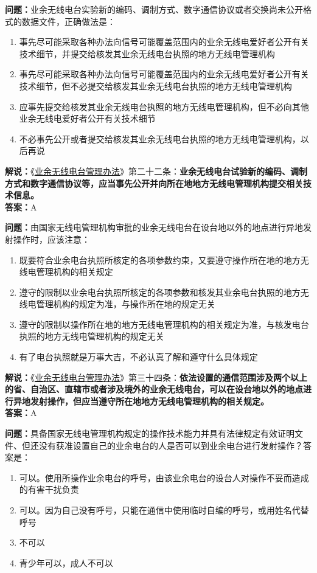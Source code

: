 \textbf{问题：}业余无线电台实验新的编码、调制方式、数字通信协议或者交换尚未公开格式的数据文件，正确做法是：
\begin{enumerate}[label=\Alph*), leftmargin=1.5cm]
	\item 事先尽可能采取各种办法向信号可能覆盖范围内的业余无线电爱好者公开有关技术细节，并提交给核发其业余无线电台执照的地方无线电管理机构
	\item 事先尽可能采取各种办法向信号可能覆盖范围内的业余无线电爱好者公开有关技术细节，但不必提交给核发其业余无线电台执照的地方无线电管理机构
	\item 应事先提交给核发其业余无线电台执照的地方无线电管理机构，但不必向其他业余无线电爱好者公开有关技术细节
	\item 不必事先公开或者提交给核发其业余无线电台执照的地方无线电管理机构，以后再说
\end{enumerate}
\textbf{解说：}《\href{https://www.miit.gov.cn/jgsj/zfs/bmgz/art/2020/art_147b69815b3641caad9047735f94c860.html}{业余无线电台管理办法}》第二十二条：\textbf{业余无线电台试验新的编码、调制方式和数字通信协议等，应当事先公开并向所在地地方无线电管理机构提交相关技术信息。}\\\textbf{答案：}A

\textbf{问题：}由国家无线电管理机构审批的业余无线电台在设台地以外的地点进行异地发射操作时，应该注意：
\begin{enumerate}[label=\Alph*), leftmargin=1.5cm]
	\item 既要符合业余电台执照所核定的各项参数约束，又要遵守操作所在地的地方无线电管理机构的相关规定
	\item 遵守的限制以业余电台执照所核定的各项参数和核发其业余电台执照的地方无线电管理机构的规定为准，与操作所在地的规定无关
	\item 遵守的限制以操作所在地的地方无线电管理机构的相关规定为准，与核发电台执照的地方无线电管理机构的规定无关
	\item 有了电台执照就是万事大吉，不必认真了解和遵守什么具体规定
\end{enumerate}
\textbf{解说：}《\href{https://www.miit.gov.cn/jgsj/zfs/bmgz/art/2020/art_147b69815b3641caad9047735f94c860.html}{业余无线电台管理办法}》第三十四条：\textbf{依法设置的通信范围涉及两个以上的省、自治区、直辖市或者涉及境外的业余无线电台，可以在设台地以外的地点进行异地发射操作，但应当遵守所在地地方无线电管理机构的相关规定。}\\\textbf{答案：}A

\textbf{问题：}具备国家无线电管理机构规定的操作技术能力并具有法律规定有效证明文件、但还没有获准设置自己的业余电台的人是否可以到业余电台进行发射操作？答案是：
\begin{enumerate}[label=\Alph*), leftmargin=1.5cm]
	\item 可以。使用所操作业余电台的呼号，由该业余电台的设台人对操作不妥而造成的有害干扰负责
	\item 可以。因为自己没有呼号，只能在通信中使用临时自编的呼号，或用姓名代替呼号
	\item 不可以
	\item 青少年可以，成人不可以
\end{enumerate}

